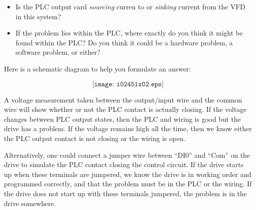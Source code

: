 \begin{itemize}
\item{} Is the PLC output card {\it sourcing} curren to or {\it sinking} current from the VFD in this system?
\item{} If the problem lies within the PLC, where exactly do you think it might be found within the PLC?  Do you think it could be a hardware problem, a software problem, or either?
\end{itemize}







Here is a schematic diagram to help you formulate an answer:

$$\texttt{[image: i02451x02.eps]}$$







A voltage measurement taken between the output/input wire and the common wire will show whether or not the PLC contact is actually closing.  If the voltage changes between PLC output states, then the PLC and wiring is good but the drive has a problem.  If the voltage remains high all the time, then we know either the PLC output contact is not closing or the wiring is open.

\vskip 10pt

Alternatively, one could connect a jumper wire between ``DI0'' and ``Com'' on the drive to simulate the PLC contact closing the control circuit.  If the drive starts up when these terminals are jumpered, we know the drive is in working order and programmed correctly, and that the problem must be in the PLC or the wiring.  If the drive does not start up with these terminals jumpered, the problem is in the drive somewhere.




